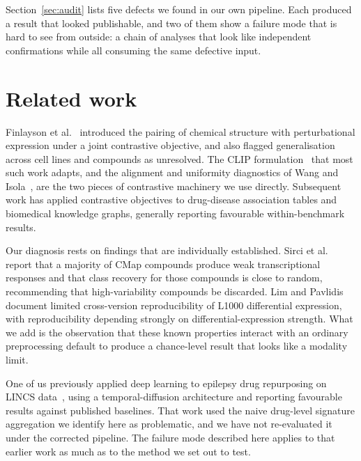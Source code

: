 \documentclass[conference]{IEEEtran}
\newif\ifanon
\begin{document}
Section~\ref{sec:audit} lists five defects we found in our own pipeline. Each
produced a result that looked publishable, and two of them show a failure mode
that is hard to see from outside: a chain of analyses that look like independent
confirmations while all consuming the same defective input.

\section{Related work}

Finlayson et al.~\cite{finlayson2021} introduced the pairing of chemical
structure with perturbational expression under a joint contrastive objective, and
also flagged generalisation across cell
lines and compounds as unresolved. The CLIP formulation~\cite{radford2021} that most such work adapts, and the alignment and uniformity
diagnostics of Wang and Isola~\cite{wang2020}, are the two pieces of contrastive machinery we
use directly. Subsequent work has applied contrastive objectives to
drug-disease association tables and biomedical knowledge graphs, generally
reporting favourable within-benchmark results.

Our diagnosis rests on findings that
are individually established. Sirci et al.~\cite{sirci2017} report that a majority of CMap
compounds produce weak transcriptional responses and that class recovery for
those compounds is close to random, recommending that high-variability compounds
be discarded. Lim and Pavlidis~\cite{lin2021} document limited cross-version reproducibility of
L1000 differential expression, with reproducibility depending strongly on
differential-expression strength. What we add is the observation that these
known properties interact with an ordinary preprocessing default to produce a
chance-level result that looks like a modality limit.

\ifanon
Deep learning has been applied to epilepsy drug
repurposing on LINCS data~\cite{kondadadi2025ctdn}, using a temporal-diffusion
architecture and reporting favourable results against published baselines. That
work used the naive drug-level signature aggregation we identify here as
problematic, and it has not been re-evaluated under the corrected pipeline. The
failure mode described here applies to that work as much as to the method we set
out to test.
\else
One of us previously applied deep
learning to epilepsy drug repurposing on LINCS data~\cite{kondadadi2025ctdn},
using a temporal-diffusion architecture and reporting favourable results against
published baselines. That work used the naive drug-level signature aggregation
we identify here as problematic, and we have not re-evaluated it under the
corrected pipeline. The failure mode described here applies to that earlier work
as much as to the method we set out to test.
\fi
\end{document}
